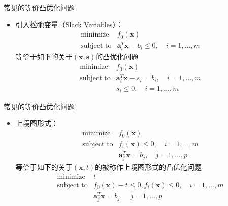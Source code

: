 
\begin{frame}

\begin{block}{常见的等价凸优化问题}
\begin{itemize}
\item 引入松弛变量（Slack Variables）：
\begin{eqnarray*}
& \text{minimize} & f_0(\mathbf{x}) \\
& \text{subject to} & \mathbf{a}_i^T\mathbf{x} - b_i \le 0, \quad i = 1,\ldots,m
\end{eqnarray*}
等价于如下的关于$(\mathbf{x},\mathbf{s})$的凸优化问题
\begin{eqnarray*}
& \text{minimize} & f_0(\mathbf{x}) \\
& \text{subject to} & \mathbf{a}_i^T\mathbf{x} - s_i = b_i, \quad i = 1,\ldots,m \\
& & s_i \le 0, \quad i = 1,\ldots,m
\end{eqnarray*}
\end{itemize}
\end{block}

\end{frame}


\begin{frame}

\begin{block}{常见的等价凸优化问题}
\begin{itemize}
\item 上境图形式：
\begin{eqnarray*}
& \text{minimize} & f_0(\mathbf{x}) \\
& \text{subject to} & f_i(\mathbf{x}) \le 0, \quad i = 1,\ldots,m \\
& & \mathbf{a}_j^T\mathbf{x} = b_j, \quad j = 1,\ldots,p
\end{eqnarray*}
等价于如下的关于$(\mathbf{x},t)$的被称作上境图形式的凸优化问题
\begin{eqnarray*}
& \text{minimize} & t \\
& \text{subject to} & f_0(\mathbf{x}) - t \le 0, f_i(\mathbf{x}) \le 0, \quad i = 1,\ldots,m \\
& & \mathbf{a}_j^T\mathbf{x} = b_j, \quad j = 1,\ldots,p
\end{eqnarray*}
\end{itemize}
\end{block}

\end{frame}

